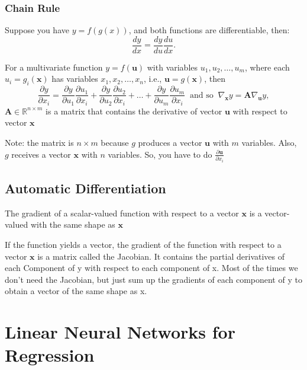 \documentclass[]{article}
\begin{document}
\subsubsection{Chain Rule}
Suppose you have $y = f(g(x))$, and both functions are differentiable, then:
\begin{equation}
    \frac{dy}{dx} = \frac{dy}{du} \frac{du}{dx}. \tag{2.4.9}
\end{equation}

For a multivariate function $y = f(\mathbf{u})$ with variables $u_1, u_2, \ldots, u_m$,
where each $u_i = g_i(\mathbf{x})$ has variables $x_1, x_2, \ldots, x_n$, i.e.,
$\mathbf{u} = g(\mathbf{x})$, then
\begin{equation}
    \frac{\partial y}{\partial x_{i}} = \frac{\partial y}{\partial u_{1}} \frac{\partial u_{1}}{\partial x_{i}} + \frac{\partial y}{\partial u_{2}} \frac{\partial u_{2}}{\partial x_{i}} + \ldots + \frac{\partial y}{\partial u_{m}} \frac{\partial u_{m}}{\partial x_{i}} \ \textrm{ and so } \ \nabla_{\mathbf{x}} y =  \mathbf{A} \nabla_{\mathbf{u}} y,
    \tag{2.4.10}
\end{equation}
$\mathbf{A} \in \mathbb{R}^{n \times m}$ is a matrix that contains the derivative of
vector $\mathbf{u}$ with respect to vector $\mathbf{x}$

Note: the matrix is $n \times m$ because $g$ produces a vector $\mathbf{u}$ with
$m$ variables. Also, $g$ receives a vector $\mathbf{x}$ with $n$ variables. So,
you have to do $\frac{\partial \mathbf{u}}{\partial x_i}$

\subsection{Automatic Differentiation}

The gradient of a scalar-valued function with respect to a vector $\mathbf{x}$ is
a vector-valued with the same shape as $\mathbf{x}$

If the function yields a vector, the gradient of the function with respect to a
vector $\mathbf{x}$ is a matrix called the Jacobian. It contains the partial derivatives
of each Component of y with respect to each component of x. Most of the times we don't
need the Jacobian, but just sum up the gradients of each component of y to obtain
a vector of the same shape as x.

\section{Linear Neural Networks for Regression}
\end{document}
